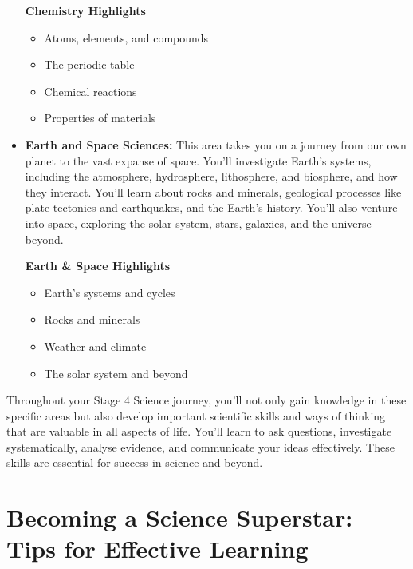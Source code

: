 \begin{itemize}
    \begin{marginnote}
    \textbf{Chemistry Highlights}
    \begin{itemize}
        \item Atoms, elements, and compounds
        \item The periodic table
        \item Chemical reactions
        \item Properties of materials
    \end{itemize}
    \end{marginnote}

    \item \textbf{Earth and Space Sciences:}  This area takes you on a journey from our own planet to the vast expanse of space.  You’ll investigate Earth’s systems, including the atmosphere, hydrosphere, lithosphere, and biosphere, and how they interact.  You'll learn about rocks and minerals, geological processes like plate tectonics and earthquakes, and the Earth’s history.  You'll also venture into space, exploring the solar system, stars, galaxies, and the universe beyond.

    \begin{marginnote}
    \textbf{Earth & Space Highlights}
    \begin{itemize}
        \item Earth's systems and cycles
        \item Rocks and minerals
        \item Weather and climate
        \item The solar system and beyond
    \end{itemize}
    \end{marginnote}
\end{itemize}

Throughout your Stage 4 Science journey, you'll not only gain knowledge in these specific areas but also develop important scientific skills and ways of thinking that are valuable in all aspects of life. You'll learn to ask questions, investigate systematically, analyse evidence, and communicate your ideas effectively.  These skills are essential for success in science and beyond.

\FloatBarrier

\section{Becoming a Science Superstar: Tips for Effective Learning}

